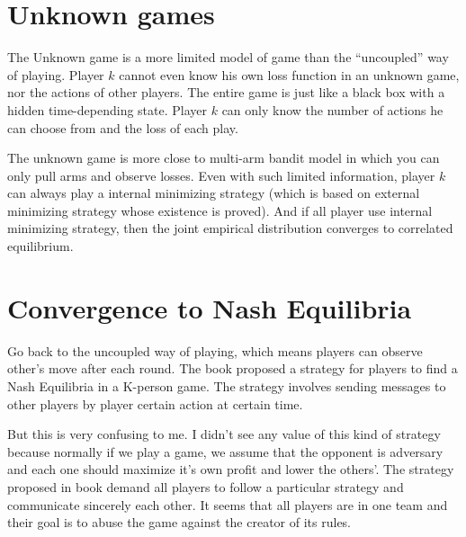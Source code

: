 \documentclass{article} %
\begin{document}
\section{Unknown games}
The Unknown game is a more limited model of game than the ``uncoupled'' way of playing. Player $k$ cannot even know his own loss function in an unknown game, nor the actions of other players. The entire game is just like a black box with a hidden time-depending state. Player $k$ can only know the number of actions he can choose from and the loss of each play.

The unknown game is more close to multi-arm bandit model in which you can only pull arms and observe losses. Even with such limited information, player $k$ can always play a internal minimizing strategy (which is based on external minimizing strategy whose existence is proved). And if all player use internal minimizing strategy, then the joint empirical distribution converges to correlated equilibrium.

\section{Convergence to Nash Equilibria}
Go back to the uncoupled way of playing, which means players can observe other's move after each round. The book proposed a strategy for players to find a Nash Equilibria in a K-person game. The strategy involves sending messages to other players by player certain action at certain time. 

But this is very confusing to me. I didn't see any value of this kind of strategy because normally if we play a game, we assume that the opponent is adversary and each one should maximize it's own profit and lower the others'. The strategy proposed in book demand all players to follow a particular strategy and communicate sincerely each other. It seems that all players are in one team and their goal is to abuse the game against the creator of its rules. 
\end{document}
